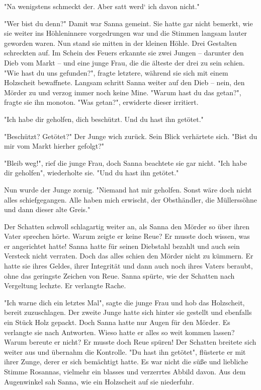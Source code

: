 \documentclass[10pt, a4paper, oneside]{book}
\begin{document}
\begin{multicols}{2}
"Na wenigstens schmeckt der. Aber satt werd‘ ich davon nicht."\bigskip

"Wer bist du denn?" Damit war Sanna gemeint. Sie hatte gar nicht bemerkt, wie sie weiter ins Höhleninnere vorgedrungen war und die Stimmen langsam lauter geworden waren. Nun stand sie mitten in der kleinen Höhle. Drei Gestalten schreckten auf. Im Schein des Feuers erkannte sie zwei Jungen – darunter den Dieb vom Markt – und eine junge Frau, die die älteste der drei zu sein schien. "Wie hast du uns gefunden?", fragte letztere, während sie sich mit einem Holzscheit bewaffnete. Langsam schritt Sanna weiter auf den Dieb – nein, den Mörder zu und verzog immer noch keine Mine. "Warum hast du das getan?", fragte sie ihn monoton. "Was getan?", erwiderte dieser irritiert.\bigskip

"Ich habe dir geholfen, dich beschützt. Und du hast ihn getötet."\bigskip

"Beschützt? Getötet?" Der Junge wich zurück. Sein Blick verhärtete sich. "Bist du mir vom Markt hierher gefolgt?"\bigskip

"Bleib weg!", rief die junge Frau, doch Sanna beachtete sie gar nicht. "Ich habe dir geholfen", wiederholte sie. "Und du hast ihn getötet."\bigskip

Nun wurde der Junge zornig. "Niemand hat mir geholfen. Sonst wäre doch nicht alles schiefgegangen. Alle haben mich erwischt, der Obsthändler, die Müllerssöhne und dann dieser alte Greis."\bigskip

Der Schatten schwoll schlagartig weiter an, als Sanna den Mörder so über ihren Vater sprechen hörte. Warum zeigte er keine Reue? Er musste doch wissen, was er angerichtet hatte! Sanna hatte für seinen Diebstahl bezahlt und auch sein Versteck nicht verraten. Doch das alles schien den Mörder nicht zu kümmern. Er hatte sie ihres Geldes, ihrer Integrität und dann auch noch ihres Vaters beraubt, ohne das geringste Zeichen von Reue. Sanna spürte, wie der Schatten nach Vergeltung lechzte. Er verlangte Rache.\bigskip

"Ich warne dich ein letztes Mal", sagte die junge Frau und hob das Holzscheit, bereit zuzuschlagen. Der zweite Junge hatte sich hinter sie gestellt und ebenfalls ein Stück Holz gepackt. Doch Sanna hatte nur Augen für den Mörder. Es verlangte sie nach Antworten. Wieso hatte er alles so weit kommen lassen? Warum bereute er nicht? Er musste doch Reue spüren! Der Schatten breitete sich weiter aus und übernahm die Kontrolle. "Du hast ihn getötet", flüsterte er mit ihrer Zunge, derer er sich bemächtigt hatte. Es war nicht die süße und liebliche Stimme Rosannas, vielmehr ein blasses und verzerrtes Abbild davon. Aus dem Augenwinkel sah Sanna, wie ein Holzscheit auf sie niederfuhr.\bigskip


\end{multicols}
\end{document}

